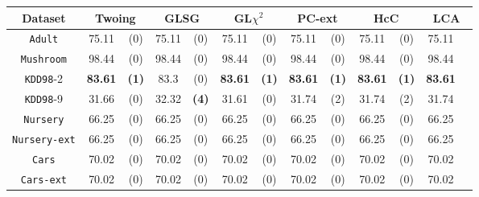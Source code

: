 \begin{table}
\small
\centering
\begin{tabular}{c|cc|cc|cc|cc|cc|cc} 
Dataset             & \multicolumn{2}{c|}{Twoing} &  \multicolumn{2}{c|}{GLSG}  & \multicolumn{2}{c|}{GL$\chi^2$} & \multicolumn{2}{c|}{PC-ext}& \multicolumn{2}{c|}{HcC} & \multicolumn{2}{c}{LCA} \\
\hline
{\tt Adult}         &  75.11       & (0)          &  75.11       & (0)          &  75.11       & (0)              & 75.11      & (0)           & 75.11      & (0)        & 75.11      &            \\
{\tt Mushroom}      &  98.44       & (0)          &  98.44       & (0)          &  98.44       & (0)              & 98.44      & (0)           & 98.44      & (0)        & 98.44      &            \\
{\tt KDD98}-2       &  {\bf 83.61} & {\bf (1)}    &  83.3        & (0)          &  {\bf 83.61} & {\bf (1)}        &{\bf 83.61} & {\bf (1)}     & {\bf 83.61}& {\bf (1)}  & {\bf 83.61}&            \\
{\tt KDD98}-9       &  31.66       & (0)          &  32.32       & {\bf (4)}    &  31.61       & (0)              & 31.74      & (2)           & 31.74      & (2)        & 31.74       &           \\
{\tt Nursery}       &  66.25       & (0)          &  66.25       & (0)          &  66.25       & (0)              & 66.25      & (0)           & 66.25      & (0)        & 66.25       &           \\
{\tt Nursery-ext}   &  66.25       & (0)          &  66.25       & (0)          &  66.25       & (0)              & 66.25      & (0)           & 66.25      & (0)        & 66.25       &           \\
{\tt Cars}          &  70.02       & (0)          &  70.02       & (0)          &  70.02       & (0)              & 70.02      & (0)           & 70.02      & (0)        & 70.02       &           \\
{\tt Cars-ext}      &  70.02       & (0)          &  70.02       & (0)          &  70.02       & (0)              & 70.02      & (0)           & 70.02      & (0)        & 70.02       &           \\

\end{tabular}
\end{table}
